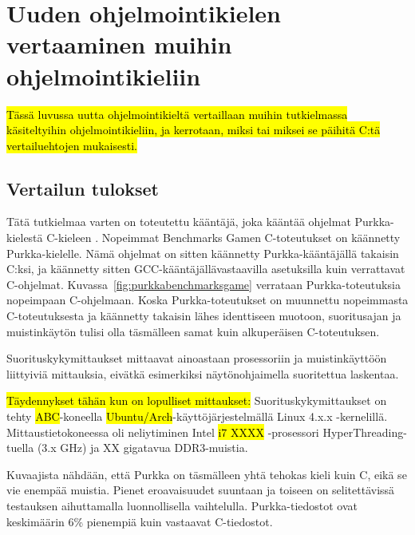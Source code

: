 \section{Uuden ohjelmointikielen vertaaminen muihin ohjelmointikieliin}

\hl{Tässä luvussa uutta ohjelmointikieltä vertaillaan muihin tutkielmassa
käsiteltyihin ohjelmointikieliin, ja kerrotaan, miksi tai miksei se päihitä
C:tä vertailuehtojen mukaisesti.}

\subsection{Vertailun tulokset}
\label{sec:results}

Tätä tutkielmaa varten on toteutettu kääntäjä, joka kääntää ohjelmat
Purkka-kielestä C-kieleen \citep{purkka}. Nopeimmat Benchmarks Gamen
C-toteutukset on käännetty Purkka-kielelle. Nämä ohjelmat on sitten käännetty
Purkka-kääntäjällä takaisin C:ksi, ja käännetty sitten
GCC-kääntäjällä\citationneeded vastaavilla asetuksilla kuin verrattavat
C-ohjelmat. Kuvassa~\ref{fig:purkkabenchmarksgame} verrataan Purkka-toteutuksia
nopeimpaan C-ohjelmaan. Koska Purkka-toteutukset on muunnettu nopeimmasta
C-toteutuksesta ja käännetty takaisin lähes identtiseen muotoon, suoritusajan
ja muistinkäytön tulisi olla täsmälleen samat kuin alkuperäisen C-toteutuksen.

Suorituskykymittaukset mittaavat ainoastaan prosessoriin ja muistinkäyttöön
liittyiviä mittauksia, eivätkä esimerkiksi näytönohjaimella suoritettua
laskentaa.

\hl{Täydennykset tähän kun on lopulliset mittaukset: } Suorituskykymittaukset
on tehty \hl{ABC}-koneella \hl{Ubuntu/Arch}-käyttöjärjestelmällä Linux 4.x.x
-kernelillä. Mittaustietokoneessa oli neliytiminen Intel \hl{i7 XXXX}
-prosessori HyperThreading-tuella (3.x GHz) ja XX gigatavua DDR3-muistia. 

Kuvaajista nähdään, että Purkka on täsmälleen yhtä tehokas kieli kuin C, eikä
se vie enempää muistia. Pienet eroavaisuudet suuntaan ja toiseen on
selitettävissä testauksen aihuttamalla luonnollisella vaihtelulla.
Purkka-tiedostot ovat keskimäärin 6\% pienempiä kuin vastaavat C-tiedostot.

